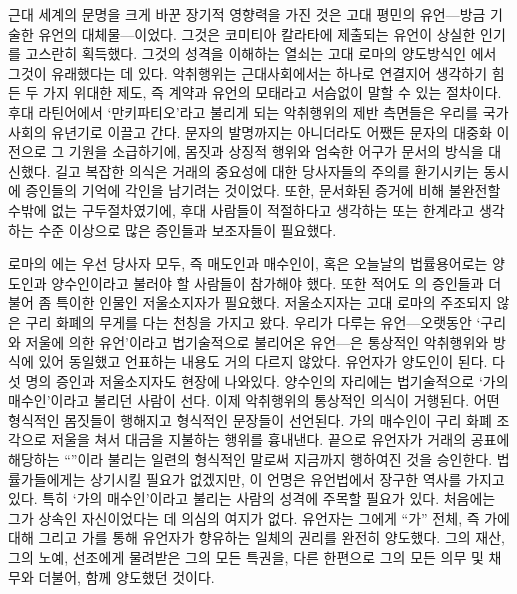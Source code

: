 근대 세계의 문명을 크게 바꾼 장기적 영향력을 가진 것은
고대 평민의 유언---방금 기술한 유언의 대체물---이었다.
그것은 코미티아 칼라타에 제출되는 유언이 상실한 인기를 고스란히 획득했다.
그것의 성격을 이해하는 열쇠는
고대 로마의 양도방식인
에서
그것이
유래했다는 데 있다.
악취행위는 근대사회에서는 하나로 연결지어 생각하기 힘든
두 가지 위대한 제도, 즉 계약과 유언의 모태라고 서슴없이 말할 수 있는 절차이다.
후대 라틴어에서 `만키파티오'라고 불리게 되는
악취행위의 제반 측면들은 우리를 국가사회의 유년기로 이끌고 간다.
문자의 발명까지는 아니더라도 어쨌든 문자의 대중화 이전으로
그 기원을 소급하기에,
몸짓과 상징적 행위와 엄숙한 어구가 문서의 방식을 대신했다.
길고 복잡한 의식은 거래의 중요성에 대한
당사자들의 주의를 환기시키는 동시에 증인들의 기억에 각인을 남기려는 것이었다.
또한, 문서화된 증거에 비해 불완전할 수밖에 없는 구두절차였기에,
후대 사람들이 적절하다고 생각하는 또는 한계라고 생각하는 수준 이상으로 많은
증인들과 보조자들이 필요했다.

로마의 에는 우선 당사자 모두, 즉 매도인과 매수인이,
혹은 오늘날의 법률용어로는 양도인과 양수인이라고 불러야 할 사람들이
참가해야 했다.
또한 적어도 의 증인들과 더불어 좀 특이한 인물인
저울소지자가 필요했다.
저울소지자는 고대 로마의 주조되지 않은 구리 화폐의 무게를 다는
천칭을 가지고 왔다.
우리가 다루는 유언---오랫동안
`구리와 저울에 의한 유언'이라고
법기술적으로 불리어온 유언---은
통상적인 악취행위와 방식에 있어 동일했고
언표하는 내용도 거의 다르지 않았다.
유언자가 양도인이 된다.
다섯 명의 증인과 저울소지자도 현장에 나와있다.
양수인의 자리에는 법기술적으로
%
`가의 매수인'이라고 불리던 사람이 선다.
이제 악취행위의 통상적인 의식이 거행된다.
어떤 형식적인 몸짓들이 행해지고 형식적인 문장들이 선언된다.
가의 매수인이
구리 화폐 조각으로 저울을 쳐서 대금을 지불하는 행위를 흉내낸다.
끝으로 유언자가
거래의 공표에 해당하는 ``''이라
불리는 일련의 형식적인 말로써 지금까지 행하여진 것을 승인한다.
법률가들에게는 상기시킬 필요가 없겠지만, 이 언명은
유언법에서 장구한 역사를 가지고 있다.
특히 `가의 매수인'이라고 불리는 사람의 성격에 주목할 필요가 있다.
처음에는 그가 상속인 자신이었다는 데 의심의 여지가 없다.
유언자는 그에게 ``가'' 전체, 즉
가에 대해 그리고 가를 통해 유언자가 향유하는 일체의 권리를 완전히 양도했다.
그의 재산, 그의 노예, 선조에게 물려받은 그의 모든 특권을,
다른 한편으로 그의 모든 의무 및 채무와 더불어, 함께 양도했던 것이다.

